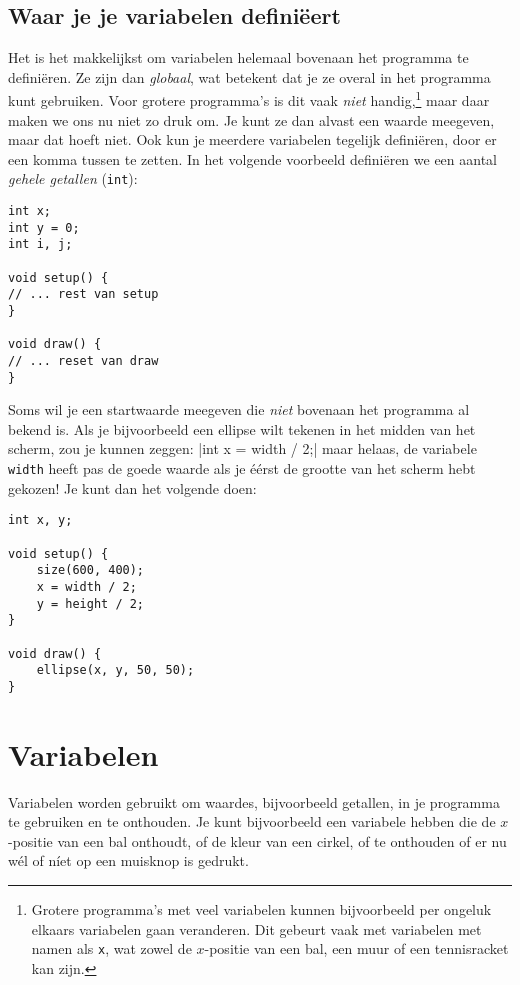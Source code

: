 \documentclass[a4paper,11pt]{report}
\begin{document}
\subsection{Waar je je variabelen definiëert}

Het is het makkelijkst om variabelen helemaal bovenaan het programma te
definiëren.  Ze zijn dan \emph{globaal}, wat betekent dat je ze overal in
het programma kunt gebruiken.  Voor grotere programma's is dit vaak
\emph{niet} handig,\footnote{Grotere programma's met veel variabelen kunnen
bijvoorbeeld per ongeluk elkaars variabelen gaan veranderen.  Dit gebeurt
vaak met variabelen met namen als \verb|x|, wat zowel de $x$-positie van
een bal, een muur of een tennisracket kan zijn.} maar daar maken we ons
nu niet zo druk om.  Je kunt ze dan alvast een waarde meegeven, maar dat
hoeft niet.  Ook kun je meerdere variabelen tegelijk definiëren, door er
een komma tussen te zetten.  In het volgende voorbeeld definiëren we een
aantal \emph{gehele getallen} (\verb|int|):
\begin{verbatim}
int x;
int y = 0;
int i, j;

void setup() {
// ... rest van setup
}

void draw() {
// ... reset van draw
}
\end{verbatim}
Soms wil je een startwaarde meegeven die \emph{niet} bovenaan het
programma al bekend is.  Als je bijvoorbeeld een ellipse wilt tekenen in
het midden van het scherm, zou je kunnen zeggen:
|int x = width / 2;| maar helaas, de variabele \verb|width|
heeft pas de goede waarde als je éérst de grootte van het scherm hebt
gekozen!  Je kunt dan het volgende doen:
\begin{verbatim}
int x, y;

void setup() {
    size(600, 400);
    x = width / 2;
    y = height / 2;
}

void draw() {
    ellipse(x, y, 50, 50);
}
\end{verbatim}


\section{Variabelen}

Variabelen worden gebruikt om waardes, bijvoorbeeld getallen, in je
programma te gebruiken en te onthouden.  Je kunt bijvoorbeeld een
variabele hebben die de $x$-positie van een bal onthoudt, of de kleur van
een cirkel, of te onthouden of er nu wél of níet op een muisknop is
gedrukt.
\end{document}
